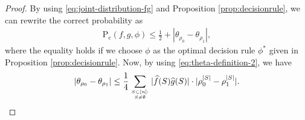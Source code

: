\documentclass[journal,draftcls, onecolumn]{IEEEtran}
\newcommand{\rom}[1]{\mathrm{#1}}
\newcommand{\Pc}{\rom{P}_{\rom{c}}}
\begin{document}
\begin{proof}
By using \eqref{eq:joint-distribution-fg} and Proposition \ref{prop:decisionrule}, we can rewrite the correct probability as
\begin{align} \label{eq:proof-Bayesian-2} 
\Pc(f,g,\phi) \le \frac{1}{2} +  |\theta_{\rho_0} - \theta_{\rho_1} |,
\end{align}
where the equality holds if we choose $\phi$ as the optimal decision rule $\phi^*$ given in Proposition \ref{prop:decisionrule}.
Now, by using \eqref{eq:theta-definition-2}, we have
\begin{align} \label{eq:proof-Bayesian-3}
|\theta_{\rho_0} - \theta_{\rho_1} | \le \frac{1}{4} \sum_{S \subset [n]: \atop S \neq \emptyset} | \widehat{f}(S) \widehat{g}(S)| \cdot | \rho_0^{|S|}-\rho_1^{|S|}|.

\end{align}
\end{proof}
\end{document}
